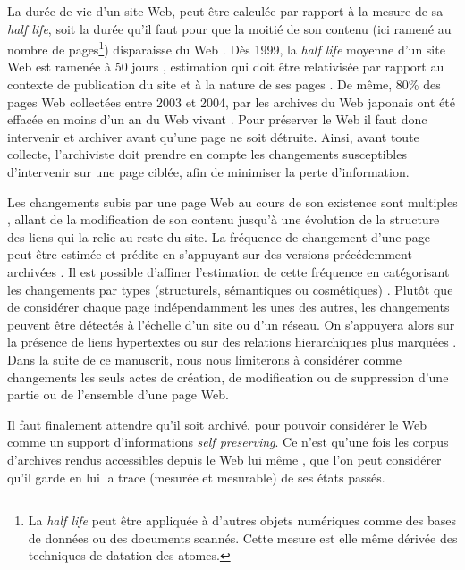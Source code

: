 \documentclass[symmetric,justified,marginals=raggedouter]{tufte-book}
\begin{document}
La durée de vie d'un site Web, peut être calculée par rapport à la mesure de sa \textit{half life}, soit la durée qu'il faut pour que la moitié de son contenu (ici ramené au nombre de pages\footnote{La \textit{half life} peut être appliquée à d'autres objets numériques comme des bases de données ou des documents scannés. Cette mesure est elle même dérivée des techniques de datation des atomes.}) disparaisse du Web \citep{koehler_longitudinal_2004}. Dès 1999, la \textit{half life} moyenne d'un site Web est ramenée à 50 jours \citep{cho_evolution_1999}, estimation qui doit être relativisée par rapport au contexte de publication du site et à la nature de ses pages \citep{mcdonnell_cataloging_1999,fetterly_large-scale_2003}. De même, 80\% des pages Web collectées entre 2003 et 2004, par les archives du Web japonais ont été effacée en moins d'un an du Web vivant \citep{toyoda_whats_2006}. Pour préserver le Web il faut donc intervenir et archiver avant qu'une page ne soit détruite. Ainsi, avant toute collecte, l'archiviste doit prendre en compte les changements susceptibles d'intervenir sur une page ciblée, afin de minimiser la perte d'information.

Les changements subis par une page Web au cours de son existence sont multiples \citep{douglis_at&t_1998, adar_web_2009}, allant de la modification de son contenu jusqu'à une évolution de la structure des liens qui la relie au reste du site. La fréquence de changement d'une page peut être estimée et prédite en s'appuyant sur des versions précédemment archivées \citep{chawathe_meaningful_1997,khoury_efficient_2007}. Il est possible d'affiner l'estimation de cette fréquence en catégorisant les changements par types (structurels, sémantiques ou cosmétiques) \citep{yadav_change_2007}. Plutôt que de considérer chaque page indépendamment les unes des autres, les changements peuvent être détectés à l'échelle d'un site ou d'un réseau. On s'appuyera alors sur la présence de liens hypertextes \citep{liu_webcq-detecting_2000} ou sur des relations hierarchiques plus marquées \citep{lim_automated_2001}. Dans la suite de ce manuscrit, nous nous limiterons à considérer comme changements les seuls actes de création, de modification ou de suppression d'une partie ou de l'ensemble d'une page Web.

Il faut finalement attendre qu'il soit archivé, pour pouvoir considérer le Web comme un support d'informations \textit{self preserving}. Ce n'est qu'une fois les corpus d'archives rendus accessibles depuis le Web lui même \citep{brugger_website_2009}, que l'on peut considérer qu'il garde en lui la trace (mesurée et mesurable) de ses états passés.\\
\end{document}

